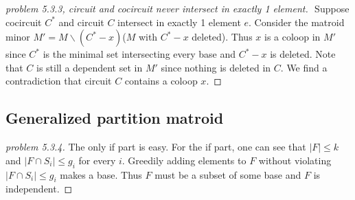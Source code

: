 \documentclass[12pt]{article}
\begin{document}
\begin{proof}[problem 5.3.3, circuit and cocircuit never intersect in exactly 1 element]
    $ $
    \newline
    Suppose cocircuit $C^*$ and circuit $C$ intersect in exactly 1 element $e$. Consider the matroid minor $M'=M\backslash(C^*-x)$($M$ with $C^* -x$ deleted). Thus $x$ is a coloop in $M'$ since $C^*$ is the minimal set intersecting every base and $C^*-x$ is deleted. Note that $C$ is still a dependent set in $M'$ since nothing is deleted in $C$. We find a contradiction that circuit $C$ contains a coloop $x$.
\end{proof}
\subsection{Generalized partition matroid}

\begin{proof}[problem 5.3.4]
    The only if part is easy. For the if part, one can see that $|F|\leq k$ and $|F\cap S_i|\leq g_i$ for every $i$. Greedily adding elements to $F$ without violating $|F\cap S_i|\leq g_i$ makes a base. Thus $F$ must be a subset of some base and $F$ is independent.
\end{proof}
\end{document}
